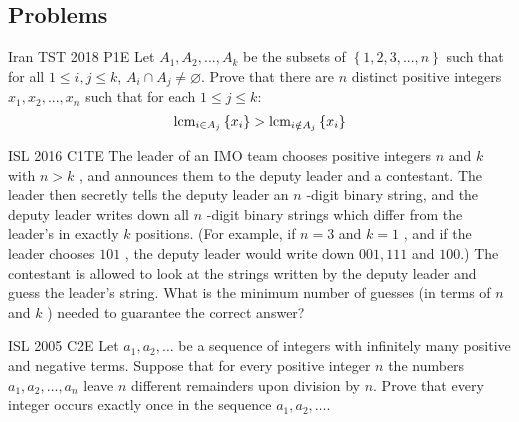 \newpage
\subsection{Problems}

{Iran TST 2018 P1}{E}{
    Let $A_1, A_2, ... , A_k$ be the subsets of $\left\{1,2,3,...,n\right\}$
    such that for all $1\leq i,j\leq k$, $A_i\cap A_j \neq \varnothing$. Prove
    that there are $n$ distinct positive integers $x_1,x_2,...,x_n$ such that
    for each $1\leq j\leq k$: 
    \[\mbox{lcm}_{i \in A_j}\left\{x_i\right\}>\mbox{lcm}_{i \notin A_j}\left\{x_i\right\}\]
}



{ISL 2016 C1}{TE}{
    The leader of an IMO team chooses positive integers $ n $ and $ k $
    with $ n > k $ , and announces them to the deputy leader and a contestant. The
    leader then secretly tells the deputy leader an $ n $ -digit binary string,
    and the deputy leader writes down all $ n $ -digit binary strings which differ
    from the leader’s in exactly $ k $ positions. (For example, if $ n = 3 $ and $
    k = 1 $ , and if the leader chooses $ 101 $ , the deputy leader would write
    down $ 001, 111 $ and $ 100 $.) The contestant is allowed to look at the
    strings written by the deputy leader and guess the leader’s string. What is
    the minimum number of guesses (in terms of $ n $ and $ k $ ) needed to
    guarantee the correct answer?
}\label{problem:constructive_algo_10}



{ISL 2005 C2}{E}{
    Let $a_1,a_2,\ldots$ be a sequence of integers with infinitely many
    positive and negative terms. Suppose that for every positive integer $n$ the
    numbers $a_1,a_2,\ldots,a_n$ leave $n$ different remainders upon division by
    $n$. Prove that every integer occurs exactly once in the sequence
    $a_1,a_2,\ldots$.
}\label{problem:constructive_algo_22}



